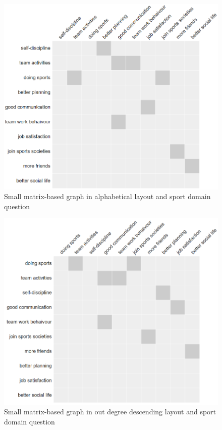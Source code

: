 \documentclass{l4proj}
\begin{document}
\begin{appendices}
\begin{figure}[H]
\centering
\includegraphics[width=16cm]{images/gymSmallAlpha.PNG}
\caption{Small matrix-based graph in alphabetical layout and sport domain question}
\label{gymSmallAlpha}
\end{figure}


\begin{figure}[H]
\centering
\includegraphics[width=16cm]{images/gymSmallOutDD.PNG}
\caption{Small matrix-based graph in out degree descending layout and sport domain question}
\label{gymSmallOutDD}
\end{figure}




\end{appendices}
\end{document}
